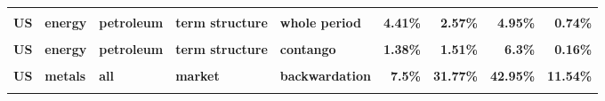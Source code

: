 \documentclass[
  authoryear,
  preprint,
  3p]{elsarticle}
\begin{document}
\begin{landscape}
\begin{longtable}[t]{>{}l>{}l>{}l>{}l>{}l>{}r>{}r>{}r>{}r}
\textbf{\cellcolor{gray!10}{US}} & \textbf{\cellcolor{gray!10}{energy}} & \textbf{\cellcolor{gray!10}{petroleum}} & \textbf{\cellcolor{gray!10}{open interest}} & \textbf{\cellcolor{gray!10}{contango}} & \textcolor[HTML]{4285f4}{\textbf{\cellcolor{gray!10}{47.85\%}}} & \textcolor[HTML]{4285f4}{\textbf{\cellcolor{gray!10}{43.02\%}}} & \textcolor[HTML]{4285f4}{\textbf{\cellcolor{gray!10}{26.44\%}}} & \textcolor[HTML]{4285f4}{\textbf{\cellcolor{gray!10}{37.7\%}}}\\
\addlinespace
\textbf{US} & \textbf{energy} & \textbf{petroleum} & \textbf{term structure} & \textbf{whole period} & \textcolor[HTML]{4285f4}{\textbf{4.41\%}} & \textcolor[HTML]{4285f4}{\textbf{2.57\%}} & \textcolor[HTML]{4285f4}{\textbf{4.95\%}} & \textcolor[HTML]{4285f4}{\textbf{0.74\%}}\\
\textbf{\cellcolor{gray!10}{US}} & \textbf{\cellcolor{gray!10}{energy}} & \textbf{\cellcolor{gray!10}{petroleum}} & \textbf{\cellcolor{gray!10}{term structure}} & \textbf{\cellcolor{gray!10}{backwardation}} & \textcolor[HTML]{4285f4}{\textbf{\cellcolor{gray!10}{9.74\%}}} & \textcolor[HTML]{4285f4}{\textbf{\cellcolor{gray!10}{4.32\%}}} & \textcolor[HTML]{4285f4}{\textbf{\cellcolor{gray!10}{2.68\%}}} & \textcolor[HTML]{4285f4}{\textbf{\cellcolor{gray!10}{2.56\%}}}\\
\textbf{US} & \textbf{energy} & \textbf{petroleum} & \textbf{term structure} & \textbf{contango} & \textcolor[HTML]{4285f4}{\textbf{1.38\%}} & \textcolor[HTML]{4285f4}{\textbf{1.51\%}} & \textcolor[HTML]{4285f4}{\textbf{6.3\%}} & \textcolor[HTML]{4285f4}{\textbf{0.16\%}}\\
\textbf{\cellcolor{gray!10}{US}} & \textbf{\cellcolor{gray!10}{metals}} & \textbf{\cellcolor{gray!10}{all}} & \textbf{\cellcolor{gray!10}{market}} & \textbf{\cellcolor{gray!10}{whole period}} & \textcolor[HTML]{4285f4}{\textbf{\cellcolor{gray!10}{7.54\%}}} & \textcolor[HTML]{4285f4}{\textbf{\cellcolor{gray!10}{30.79\%}}} & \textcolor[HTML]{4285f4}{\textbf{\cellcolor{gray!10}{38.2\%}}} & \textcolor[HTML]{4285f4}{\textbf{\cellcolor{gray!10}{18.58\%}}}\\
\textbf{US} & \textbf{metals} & \textbf{all} & \textbf{market} & \textbf{backwardation} & \textcolor[HTML]{4285f4}{\textbf{7.5\%}} & \textcolor[HTML]{4285f4}{\textbf{31.77\%}} & \textcolor[HTML]{4285f4}{\textbf{42.95\%}} & \textcolor[HTML]{4285f4}{\textbf{11.54\%}}\\
\addlinespace
\textbf{\cellcolor{gray!10}{US}} & \textbf{\cellcolor{gray!10}{metals}} & \textbf{\cellcolor{gray!10}{all}} & \textbf{\cellcolor{gray!10}{market}} & \textbf{\cellcolor{gray!10}{contango}} & \textcolor[HTML]{4285f4}{\textbf{\cellcolor{gray!10}{7.63\%}}} & \textcolor[HTML]{4285f4}{\textbf{\cellcolor{gray!10}{30.19\%}}} & \textcolor[HTML]{4285f4}{\textbf{\cellcolor{gray!10}{36.15\%}}} & \textcolor[HTML]{4285f4}{\textbf{\cellcolor{gray!10}{23\%}}}\\

\end{longtable}
\end{landscape}
\end{document}
